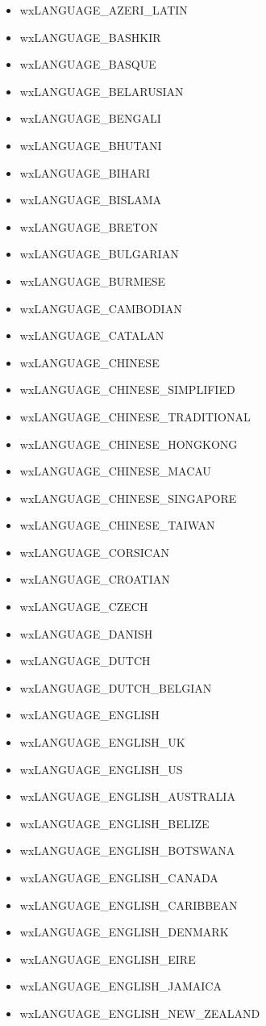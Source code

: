 \begin{itemize}
\item wxLANGUAGE\_AZERI\_LATIN
\item wxLANGUAGE\_BASHKIR
\item wxLANGUAGE\_BASQUE
\item wxLANGUAGE\_BELARUSIAN
\item wxLANGUAGE\_BENGALI
\item wxLANGUAGE\_BHUTANI
\item wxLANGUAGE\_BIHARI
\item wxLANGUAGE\_BISLAMA
\item wxLANGUAGE\_BRETON
\item wxLANGUAGE\_BULGARIAN
\item wxLANGUAGE\_BURMESE
\item wxLANGUAGE\_CAMBODIAN
\item wxLANGUAGE\_CATALAN
\item wxLANGUAGE\_CHINESE
\item wxLANGUAGE\_CHINESE\_SIMPLIFIED
\item wxLANGUAGE\_CHINESE\_TRADITIONAL
\item wxLANGUAGE\_CHINESE\_HONGKONG
\item wxLANGUAGE\_CHINESE\_MACAU
\item wxLANGUAGE\_CHINESE\_SINGAPORE
\item wxLANGUAGE\_CHINESE\_TAIWAN
\item wxLANGUAGE\_CORSICAN
\item wxLANGUAGE\_CROATIAN
\item wxLANGUAGE\_CZECH
\item wxLANGUAGE\_DANISH
\item wxLANGUAGE\_DUTCH
\item wxLANGUAGE\_DUTCH\_BELGIAN
\item wxLANGUAGE\_ENGLISH
\item wxLANGUAGE\_ENGLISH\_UK
\item wxLANGUAGE\_ENGLISH\_US
\item wxLANGUAGE\_ENGLISH\_AUSTRALIA
\item wxLANGUAGE\_ENGLISH\_BELIZE
\item wxLANGUAGE\_ENGLISH\_BOTSWANA
\item wxLANGUAGE\_ENGLISH\_CANADA
\item wxLANGUAGE\_ENGLISH\_CARIBBEAN
\item wxLANGUAGE\_ENGLISH\_DENMARK
\item wxLANGUAGE\_ENGLISH\_EIRE
\item wxLANGUAGE\_ENGLISH\_JAMAICA
\item wxLANGUAGE\_ENGLISH\_NEW\_ZEALAND

\end{itemize}
